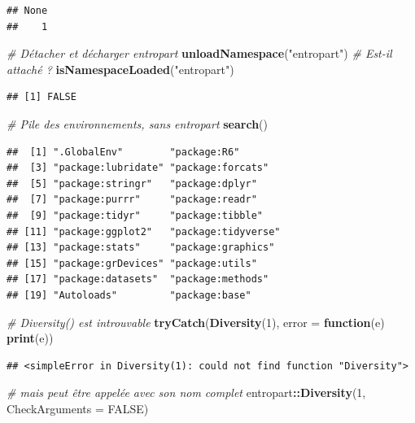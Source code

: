 \documentclass[
  12pt,
  french,
  a4paper,
  extrafontsizes,onecolumn,openright
  ]{memoir}
\newenvironment{Shaded}{\begin{snugshade}}{\end{snugshade}}
\newcommand{\AttributeTok}[1]{\textcolor[rgb]{0.13,0.29,0.53}{#1}}
\newcommand{\CommentTok}[1]{\textcolor[rgb]{0.56,0.35,0.01}{\textit{#1}}}
\newcommand{\ConstantTok}[1]{\textcolor[rgb]{0.56,0.35,0.01}{#1}}
\newcommand{\ControlFlowTok}[1]{\textcolor[rgb]{0.13,0.29,0.53}{\textbf{#1}}}
\newcommand{\DecValTok}[1]{\textcolor[rgb]{0.00,0.00,0.81}{#1}}
\newcommand{\FunctionTok}[1]{\textcolor[rgb]{0.13,0.29,0.53}{\textbf{#1}}}
\newcommand{\NormalTok}[1]{#1}
\newcommand{\SpecialCharTok}[1]{\textcolor[rgb]{0.81,0.36,0.00}{\textbf{#1}}}
\newcommand{\StringTok}[1]{\textcolor[rgb]{0.31,0.60,0.02}{#1}}
\begin{document}
\begin{verbatim}
## None 
##    1
\end{verbatim}

\begin{Shaded}
\begin{Highlighting}[]
\CommentTok{\# Détacher et décharger entropart}
\FunctionTok{unloadNamespace}\NormalTok{(}\StringTok{"entropart"}\NormalTok{)}
\CommentTok{\# Est{-}il attaché ?}
\FunctionTok{isNamespaceLoaded}\NormalTok{(}\StringTok{"entropart"}\NormalTok{)}
\end{Highlighting}
\end{Shaded}

\begin{verbatim}
## [1] FALSE
\end{verbatim}

\begin{Shaded}
\begin{Highlighting}[]
\CommentTok{\# Pile des environnements, sans entropart}
\FunctionTok{search}\NormalTok{()}
\end{Highlighting}
\end{Shaded}

\begin{verbatim}
##  [1] ".GlobalEnv"        "package:R6"       
##  [3] "package:lubridate" "package:forcats"  
##  [5] "package:stringr"   "package:dplyr"    
##  [7] "package:purrr"     "package:readr"    
##  [9] "package:tidyr"     "package:tibble"   
## [11] "package:ggplot2"   "package:tidyverse"
## [13] "package:stats"     "package:graphics" 
## [15] "package:grDevices" "package:utils"    
## [17] "package:datasets"  "package:methods"  
## [19] "Autoloads"         "package:base"
\end{verbatim}

\begin{Shaded}
\begin{Highlighting}[]
\CommentTok{\# Diversity() est introuvable}
\FunctionTok{tryCatch}\NormalTok{(}\FunctionTok{Diversity}\NormalTok{(}\DecValTok{1}\NormalTok{), }\AttributeTok{error =} \ControlFlowTok{function}\NormalTok{(e) }\FunctionTok{print}\NormalTok{(e))}
\end{Highlighting}
\end{Shaded}

\begin{verbatim}
## <simpleError in Diversity(1): could not find function "Diversity">
\end{verbatim}

\begin{Shaded}
\begin{Highlighting}[]
\CommentTok{\# mais peut être appelée avec son nom complet}
\NormalTok{entropart}\SpecialCharTok{::}\FunctionTok{Diversity}\NormalTok{(}\DecValTok{1}\NormalTok{, }\AttributeTok{CheckArguments =} \ConstantTok{FALSE}\NormalTok{)}
\end{Highlighting}
\end{Shaded}
\end{document}
